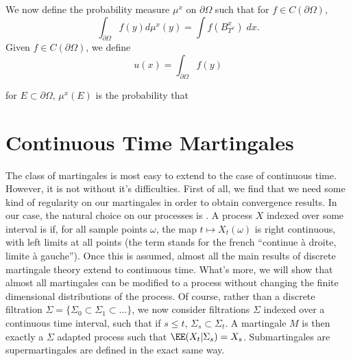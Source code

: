 We now define the probability measure $\mu^x$ on $\partial \Omega$ such that for $f \in C(\partial \Omega)$,
%
\[ \int_{\partial \Omega} f(y) d\mu^x(y) = \int f(B_{T^x}^x)\; dx. \]
%
Given $f \in C(\partial \Omega)$, we define
%
\[ u(x) = \int_{\partial \Omega} f(y) \]

for $E \subset \partial \Omega$, $\mu^x(E)$ is the probability that

\chapter{Continuous Time Martingales}

The class of martingales is most easy to extend to the case of continuous time. However, it is not without it's difficulties. First of all, we find that we need some kind of regularity on our martingales in order to obtain convergence results. In our case, the natural choice on our processes is {\it \cadlag}. A process $X$ indexed over some interval is \cadlag if, for all sample points $\omega$, the map $t \mapsto X_t(\omega)$ is right continuous, with left limits at all points (the term \cadlag stands for the french ``continue \`{a} droite, limite \`{a} gauche''). Once this is assumed, almost all the main results of discrete martingale theory extend to continuous time. What's more, we will show that almost all martingales can be modified to a \cadlag process without changing the finite dimensional distributions of the process. Of course, rather than a discrete filtration $\Sigma = \{ \Sigma_0 \subset \Sigma_1 \subset \dots \}$, we now consider filtrations $\Sigma$ indexed over a continuous time interval, such that if $s \leq t$, $\Sigma_s \subset \Sigma_t$. A martingale $M$ is then exactly a $\Sigma$ adapted process such that $\EE(X_t|\Sigma_s) = X_s$. Submartingales are supermartingales are defined in the exact same way.

